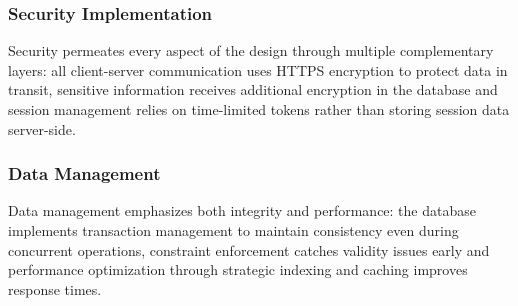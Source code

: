 \subsubsection{Security Implementation}
Security permeates every aspect of the design through multiple complementary layers: all client-server communication uses HTTPS encryption to protect data in transit, sensitive information receives additional encryption in the database and session management relies on time-limited tokens rather than storing session data server-side.

\subsubsection{Data Management}
Data management emphasizes both integrity and performance: the database implements transaction management to maintain consistency even during concurrent operations, constraint enforcement catches validity issues early and performance optimization through strategic indexing and caching improves response times.
